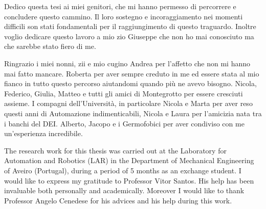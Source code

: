 Dedico questa tesi ai miei genitori, che mi hanno permesso  di percorrere e concludere questo cammino. Il loro sostegno e incoraggiamento nei momenti difficili son stati fondamentali per il raggiungimento di questo traguardo. Inoltre voglio dedicare questo lavoro a mio zio Giuseppe che non ho mai conosciuto ma che sarebbe stato fiero di me.
\vspace{2em}

Ringrazio i miei nonni, zii e mio cugino Andrea per l'affetto che non mi hanno mai fatto mancare. Roberta per aver sempre creduto in me ed essere stata al mio fianco in tutto questo percorso aiutandomi quando più ne avevo bisogno. Nicola, Federico, Giulia, Matteo e tutti gli amici di Montegrotto per essere cresciuti assieme. I compagni dell'Università, in particolare Nicola e Marta per aver reso questi anni di Automazione indimenticabili, Nicola e Laura per l'amicizia nata tra i banchi del DEI. Alberto, Jacopo e i Germofobici per aver condiviso con me un'esperienza incredibile. 
\vspace{2em}

The research work for this thesis was carried out at the Laboratory for Automation and Robotics (LAR) in the Department of Mechanical Engineering of Aveiro (Portugal), during a period of 5 months as an exchange student.
I would like to express my gratitude to Professor Vitor Santos. His help has been invaluable both personally and academically. Moreover I would like to thank Professor Angelo Cenedese for his advices and his help during this work.



